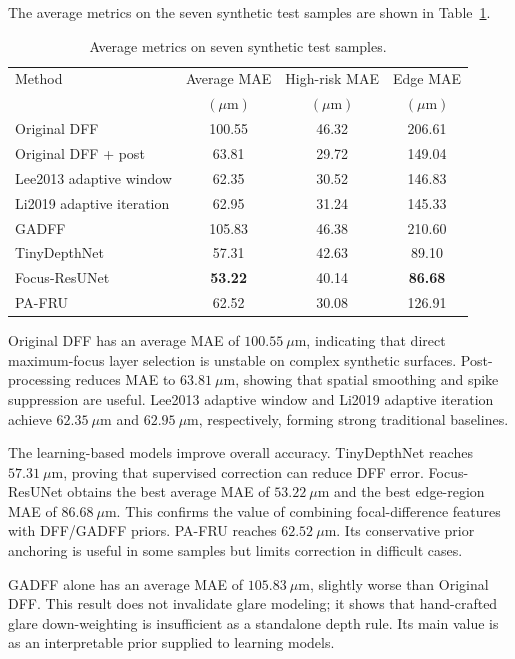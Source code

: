 \documentclass[11pt,a4paper]{article}
\begin{document}
The average metrics on the seven synthetic test samples are shown in Table~\ref{tab:synthetic_average}.

\begin{table}[htbp]
\centering
\caption{Average metrics on seven synthetic test samples.}
\label{tab:synthetic_average}
\small
\begin{tabular}{lccc}
\toprule
Method & Average MAE & High-risk MAE & Edge MAE \\
 & \((\mu\mathrm{m})\) & \((\mu\mathrm{m})\) & \((\mu\mathrm{m})\) \\
\midrule
Original DFF & 100.55 & 46.32 & 206.61 \\
Original DFF + post & 63.81 & 29.72 & 149.04 \\
Lee2013 adaptive window & 62.35 & 30.52 & 146.83 \\
Li2019 adaptive iteration & 62.95 & 31.24 & 145.33 \\
GADFF & 105.83 & 46.38 & 210.60 \\
TinyDepthNet & 57.31 & 42.63 & 89.10 \\
Focus-ResUNet & \textbf{53.22} & 40.14 & \textbf{86.68} \\
PA-FRU & 62.52 & 30.08 & 126.91 \\
\bottomrule
\end{tabular}
\end{table}

Original DFF has an average MAE of \(100.55~\mu\mathrm{m}\), indicating that direct maximum-focus layer selection is unstable on complex synthetic surfaces. Post-processing reduces MAE to \(63.81~\mu\mathrm{m}\), showing that spatial smoothing and spike suppression are useful. Lee2013 adaptive window and Li2019 adaptive iteration achieve \(62.35~\mu\mathrm{m}\) and \(62.95~\mu\mathrm{m}\), respectively, forming strong traditional baselines.

The learning-based models improve overall accuracy. TinyDepthNet reaches \(57.31~\mu\mathrm{m}\), proving that supervised correction can reduce DFF error. Focus-ResUNet obtains the best average MAE of \(53.22~\mu\mathrm{m}\) and the best edge-region MAE of \(86.68~\mu\mathrm{m}\). This confirms the value of combining focal-difference features with DFF/GADFF priors. PA-FRU reaches \(62.52~\mu\mathrm{m}\). Its conservative prior anchoring is useful in some samples but limits correction in difficult cases.

GADFF alone has an average MAE of \(105.83~\mu\mathrm{m}\), slightly worse than Original DFF. This result does not invalidate glare modeling; it shows that hand-crafted glare down-weighting is insufficient as a standalone depth rule. Its main value is as an interpretable prior supplied to learning models.
\end{document}
